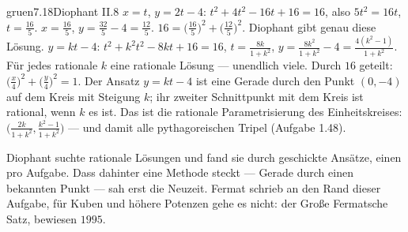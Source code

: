 \begin{loesungkarte}{gruen}{7.18}{Diophant II.8}
$x = t$, $y = 2t - 4$: $t^{2} + 4t^{2} - 16t + 16 = 16$, also $5t^{2} = 16t$, $t = \frac{16}5$. $x = \frac{16}5$, $y = \frac{32}5 - 4 = \frac{12}5$. $16 = \bigl(\frac{16}5\bigr)^{2} + \bigl(\frac{12}5\bigr)^{2}$. Diophant gibt genau diese Lösung.
$y = kt - 4$: $t^{2} + k^{2}t^{2} - 8kt + 16 = 16$, $t = \frac{8k}{1 + k^{2}}$, $y = \frac{8k^{2}}{1 + k^{2}} - 4 = \frac{4(k^{2} - 1)}{1 + k^{2}}$. Für jedes rationale $k$ eine rationale Lösung --- unendlich viele.
Durch $16$ geteilt: $\bigl(\frac x4\bigr)^{2} + \bigl(\frac y4\bigr)^{2} = 1$. Der Ansatz $y = kt - 4$ ist eine Gerade durch den Punkt $(0, -4)$ auf dem Kreis mit Steigung $k$; ihr zweiter Schnittpunkt mit dem Kreis ist rational, wenn $k$ es ist. Das ist die rationale Parametrisierung des Einheitskreises: $\bigl(\frac{2k}{1 + k^{2}}, \frac{k^{2} - 1}{1 + k^{2}}\bigr)$ --- und damit alle pythagoreischen Tripel (Aufgabe 1.48).
\begin{mitnehmen}\kastentext
Diophant suchte rationale Lösungen und fand sie durch geschickte Ansätze, einen pro Aufgabe. Dass dahinter eine Methode steckt --- Gerade durch einen bekannten Punkt --- sah erst die Neuzeit. Fermat schrieb an den Rand dieser Aufgabe, für Kuben und höhere Potenzen gehe es nicht: der Große Fermatsche Satz, bewiesen $1995$.
\end{mitnehmen}
\end{loesungkarte}

